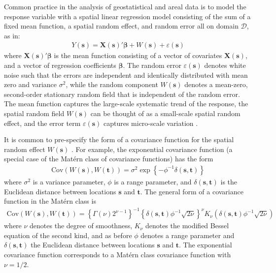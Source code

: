\documentclass[authoryear, review, 11pt]{elsarticle}
\begin{document}
	 Common practice in the analysis of geostatistical and areal data is to model the response variable with a spatial linear regression model consisting of the sum of a fixed mean function, a spatial random effect, and random error all on domain $\mathcal{D}$, as in: 
\begin{align}\label{eq:spatial-regression}
    Y(\bm{s}) = \bm{X}(\bm{s})'\bm{\beta} + W(\bm{s}) + \varepsilon(\bm{s})
\end{align}
where $\bm{X}(\bm{s})'\bm{\beta}$ is the mean function consisting of a vector of covariates $\bm{X}(\bm{s})$, and a vector of regression coefficients $\bm{\beta}$. The random error $\varepsilon(\bm{s})$ denotes white noise such that the errors are independent and identically distributed with mean zero and variance $\sigma^2$, while the random component $W(\bm{s})$ denotes a mean-zero, second-order stationary random field that is independent of the random error. The mean function captures the large-scale systematic trend of the response, the spatial random field $W(\bm{s})$ can be thought of as a small-scale spatial random effect, and the error term $\varepsilon(\bm{s})$ captures micro-scale variation \citep{Cressie:1993}.

It is common to pre-specify the form of a covariance function for the spatial random effect $W(\bm{s})$ \citep{Diggle:2007}. For example, the exponential covariance function (a special case of the Mat\'{e}rn class of covariance functions) has the form
\begin{align}\label{eq:exponential-covariance}
    \text{Cov}(W(\bm{s}), W(\bm{t})) = \sigma^2 \exp\left\{-\phi^{-1} \delta(\bm{s}, \bm{t}) \right\}
\end{align}
where $\sigma^2$ is a variance parameter, $\phi$ is a range parameter, and $\delta(\bm{s}, \bm{t})$ is the Euclidean distance between locations $\bm{s}$ and $\bm{t}$. The general form of a covariance function in the Mat\'{e}rn class is
\begin{align}\label{eq:matern-covarinace}
    \text{Cov}(W(\bm{s}), W(\bm{t})) = \left\{\Gamma(\nu) 2^{\nu-1} \right\}^{-1} \left\{\delta(\bm{s}, \bm{t}) \phi^{-1}\sqrt{2\nu}\right\}^\nu K_{\nu} \left(\delta(\bm{s}, \bm{t}) \phi^{-1}\sqrt{2\nu}\right)
    \end{align}
where $\nu$ denotes the degree of smoothness, $K_{\nu}$ denotes the modified Bessel equation of the second kind, and as before $\phi$ denotes a range parameter and $\delta(\bm{s}, \bm{t})$ the Euclidean distance between locations $\bm{s}$ and $\bm{t}$. The exponential covariance function corresponds to a Mat\'{e}rn class covariance function with $\nu = 1/2$.
\end{document}
